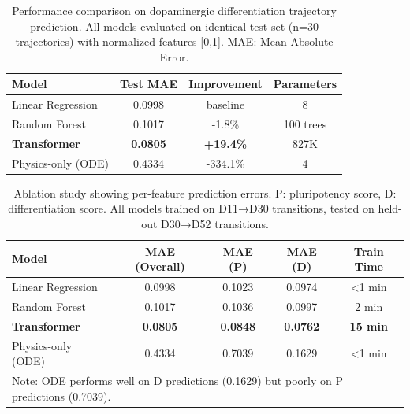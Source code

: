 

\begin{table}[t]
\centering
\caption{Performance comparison on dopaminergic differentiation trajectory prediction. All models evaluated on identical test set (n=30 trajectories) with normalized features [0,1]. MAE: Mean Absolute Error.}
\label{tab:model_comparison}
\begin{tabular}{lccc}
\toprule
\textbf{Model} & \textbf{Test MAE} & \textbf{Improvement} & \textbf{Parameters} \\
\midrule
Linear Regression & 0.0998 & baseline & 8 \\
Random Forest & 0.1017 & -1.8\% & 100 trees \\
\textbf{Transformer} & \textbf{0.0805} & \textbf{+19.4\%} & 827K \\
Physics-only (ODE) & 0.4334 & -334.1\% & 4 \\
\bottomrule
\end{tabular}
\end{table}


\begin{table}[t]
\centering
\caption{Ablation study showing per-feature prediction errors. P: pluripotency score, D: differentiation score. All models trained on D11→D30 transitions, tested on held-out D30→D52 transitions.}
\label{tab:ablation_study}
\begin{tabular}{lcccc}
\toprule
\textbf{Model} & \textbf{MAE (Overall)} & \textbf{MAE (P)} & \textbf{MAE (D)} & \textbf{Train Time} \\
\midrule
Linear Regression & 0.0998 & 0.1023 & 0.0974 & <1 min \\
Random Forest & 0.1017 & 0.1036 & 0.0997 & 2 min \\
\textbf{Transformer} & \textbf{0.0805} & \textbf{0.0848} & \textbf{0.0762} & \textbf{15 min} \\
Physics-only (ODE) & 0.4334 & 0.7039 & 0.1629 & <1 min \\
\bottomrule
\multicolumn{5}{l}{\footnotesize Note: ODE performs well on D predictions (0.1629) but poorly on P predictions (0.7039).} \\
\end{tabular}
\end{table}

